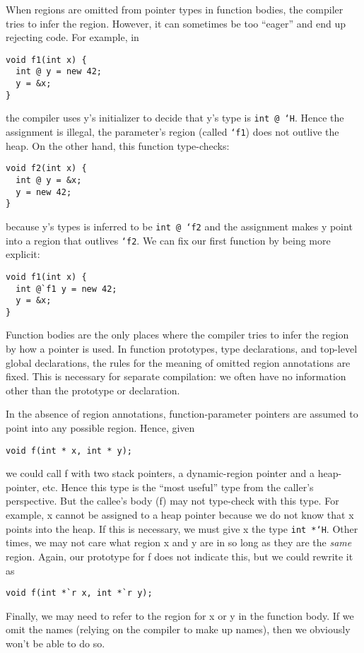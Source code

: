 When regions are omitted from pointer types in function bodies, the
compiler tries to infer the region.  However, it can sometimes be too
``eager'' and end up rejecting code.  For example, in
\begin{verbatim}
void f1(int x) {
  int @ y = new 42;
  y = &x;
}
\end{verbatim}
the compiler uses y's initializer to decide that y's type is
\texttt{int @ `H}.  Hence the assignment is illegal, the parameter's
region (called \texttt{`f1}) does not outlive the heap.  On the other
hand, this function type-checks:
\begin{verbatim}
void f2(int x) {
  int @ y = &x;
  y = new 42;
}
\end{verbatim}
because y's types is inferred to be \texttt{int @ `f2} and the
assignment makes y point into a region that outlives \texttt{`f2}.  We
can fix our first function by being more explicit:
\begin{verbatim}
void f1(int x) {
  int @`f1 y = new 42;
  y = &x;
}
\end{verbatim}

Function bodies are the only places where the compiler tries to infer
the region by how a pointer is used.  In function prototypes, type
declarations, and top-level global declarations, the rules for the
meaning of omitted region annotations are fixed.  This is necessary
for separate compilation: we often have no information other than the
prototype or declaration.

In the absence of region annotations, function-parameter pointers are
assumed to point into any possible region.  Hence, given
\begin{verbatim}
void f(int * x, int * y);
\end{verbatim}
we could call f with two stack pointers, a dynamic-region pointer and
a heap-pointer, etc.  Hence this type is the ``most useful'' type from
the caller's perspective.  But the callee's body (f) may not
type-check with this type.  For example, x cannot be assigned to a
heap pointer because we do not know that x points into the heap.  If
this is necessary, we must give x the type \texttt{int *`H}.  Other
times, we may not care what region x and y are in so long as they are
the \emph{same} region.  Again, our prototype for f does not indicate
this, but we could rewrite it as
\begin{verbatim}
void f(int *`r x, int *`r y);
\end{verbatim}
Finally, we may need to refer to the region for x or y in the function
body.  If we omit the names (relying on the compiler to make up
names), then we obviously won't be able to do so.

